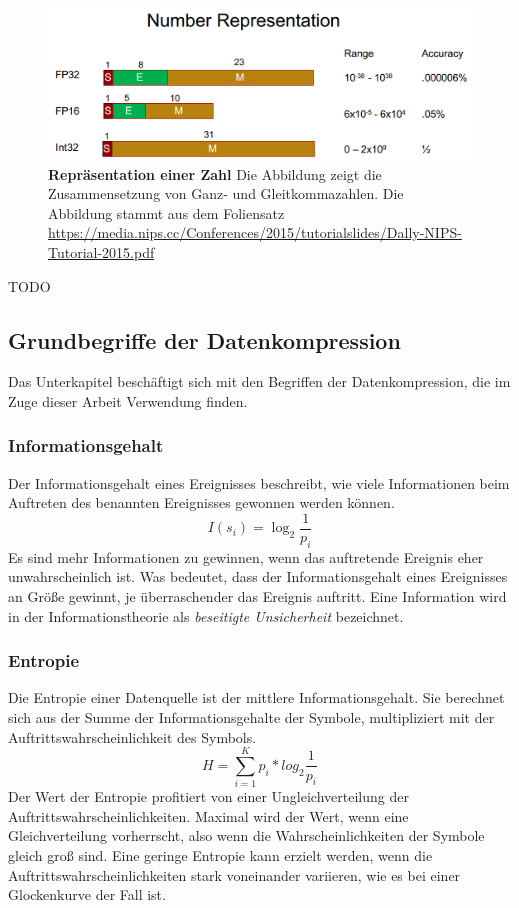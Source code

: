 \begin{figure}[htb]
  \centering  
  \includegraphics[scale=0.50]{Bilder/number_representation.png}
  \caption[Repräsentation einer Zahl]{\textbf{Repräsentation einer Zahl} Die Abbildung zeigt die Zusammensetzung von Ganz- und Gleitkommazahlen. Die Abbildung stammt aus dem Foliensatz \url{https://media.nips.cc/Conferences/2015/tutorialslides/Dally-NIPS-Tutorial-2015.pdf}}
  \label{fig:number_representation}
\end{figure}

TODO

\subsection{Grundbegriffe der Datenkompression}
\label{subsec:grundbegriffe_datenkompression}
Das Unterkapitel beschäftigt sich mit den Begriffen der Datenkompression, die im Zuge dieser Arbeit Verwendung finden.

\subsubsection*{Informationsgehalt}
Der Informationsgehalt eines Ereignisses beschreibt, wie viele Informationen beim Auftreten des benannten Ereignisses gewonnen werden können.
\begin{equation*}
I(s_i) = \log_2 \frac{1}{p_i}
\end{equation*}
Es sind mehr Informationen zu gewinnen, wenn das auftretende Ereignis eher unwahrscheinlich ist.
Was bedeutet, dass der Informationsgehalt eines Ereignisses an Größe gewinnt, je überraschender das Ereignis auftritt.
Eine Information wird in der Informationstheorie als \textit{beseitigte Unsicherheit} bezeichnet.

\subsubsection*{Entropie}
Die Entropie einer Datenquelle ist der mittlere Informationsgehalt.
Sie berechnet sich aus der Summe der Informationsgehalte der Symbole, multipliziert mit der Auftrittswahrscheinlichkeit des Symbols.
\begin{equation*}
H = \sum_{i = 1}^{K} p_i * log_2 \frac{1}{p_i}
\end{equation*}
Der Wert der Entropie profitiert von einer Ungleichverteilung der Auftrittswahrscheinlichkeiten.
Maximal wird der Wert, wenn eine Gleichverteilung vorherrscht, also wenn die Wahrscheinlichkeiten der Symbole gleich groß sind.
Eine geringe Entropie kann erzielt werden, wenn die Auftrittswahrscheinlichkeiten stark voneinander variieren, wie es bei einer Glockenkurve der Fall ist. 

